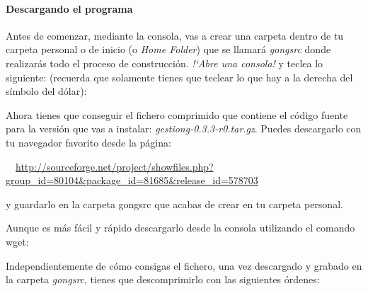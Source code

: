\clearpage\paragraph{Descargando el programa}
Antes de comenzar, mediante la consola, vas a crear una carpeta dentro
de tu carpeta personal o de inicio (o {\textquotesingle}\textit{Home
Folder}{\textquotesingle}) que se llamará
{\textquotesingle}\textit{gongsrc}{\textquotesingle} donde realizarás
todo el proceso de construcción. \textit{!`Abre una consola!} y
teclea lo siguiente: (recuerda que solamente tienes que teclear lo que
hay a la derecha del símbolo del dólar):



\begin{center}
\begin{minipage}{16.48cm}


\end{minipage}
\end{center}

\bigskip

Ahora tienes que conseguir el fichero comprimido que contiene el
código fuente para la versión que vas a instalar:
\textit{gestiong-0.3.3-r0.tar.gz}. Puedes descargarlo con tu navegador
favorito desde la página:

\ \ \url{http://sourceforge.net/project/showfiles.php?group_id=80104&package_id=81685&release_id=578703}



\bigskip

y guardarlo en la carpeta gongsrc que acabas de crear en tu carpeta
personal.


\bigskip

Aunque es más fácil y rápido descargarlo desde la consola
utilizando el comando wget: 



\begin{center}
\begin{minipage}{16.48cm}
\end{minipage}
\end{center}
Independientemente de cómo consigas el fichero, una vez descargado y
grabado en la carpeta
{\textquotesingle}\textit{gongsrc}{\textquotesingle}, tienes que
descomprimirlo con las siguientes órdenes:

